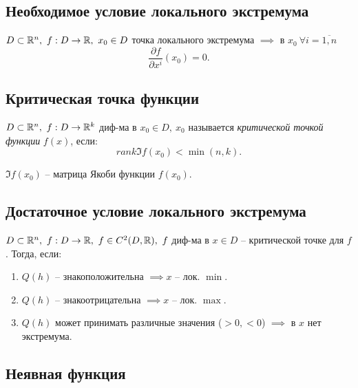 \subsection{Необходимое условие локального экстремума}

\begin{theorem}
    $ D \subset \mathbb{R}^n, \ f:D \rightarrow\mathbb{R}, \ x_0 \in D $ точка локального экстремума $ \implies $ в $ x_0 \ \forall i = \overline{1,n}$
    \[
        \frac{\partial f}{\partial x^i}(x_0) = 0.
    \]
\end{theorem}

\subsection{Критическая точка функции}

\begin{definition}
    $ D \subset \mathbb{R}^n, \ f:D \rightarrow\mathbb{R}^k $ диф-ма в $ x_0 \in D, \ x_0 $ называется \emph{критической точкой функции} $ f(x) $, если:
    \[
        rank \mathfrak{I} f(x_0) < \min(n,k).
    \]
\end{definition}

\begin{note}
    $ \mathfrak{I}f(x_0) $ -- матрица Якоби функции $ f(x_0) $.
\end{note}

\newpage

\subsection{Достаточное условие локального экстремума}

\begin{theorem}
    $ D \subset \mathbb{R}^n, \ f: D \rightarrow \mathbb{R}, \ f \in C^2(D,\mathbb{R}), \ f$ диф-ма в $x \in D $ -- критической точке для $ f $. Тогда, если:
    \begin{enumerate}
        \item $Q(h)$ -- знакоположительна $\implies x$ -- лок. $ \min $.
        \item $Q(h)$ -- знакоотрицательна $\implies x$ -- лок. $ \max $.
        \item $Q(h)$ может принимать различные значения ($>0, < 0$) $\implies $ в $ x$ нет экстремума.
    \end{enumerate}
\end{theorem}

\subsection{Неявная функция}

